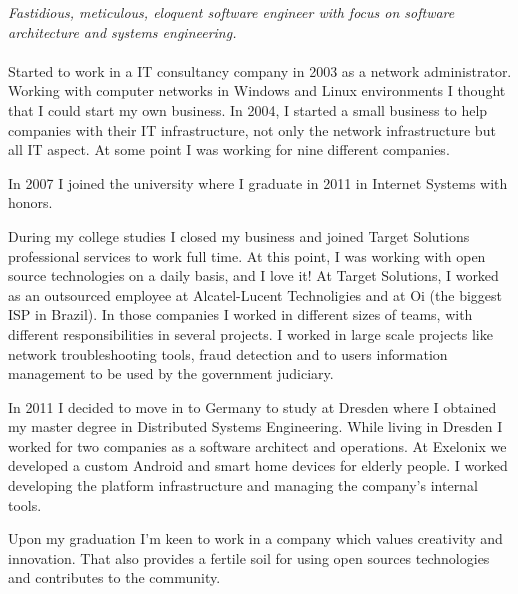 \documentclass[10pt,a4paper]{article}
\begin{document}
\vspace{-1.3em}  %
\begin{multicols}{2}  %
\noindent \emph{Fastidious, meticulous, eloquent software engineer with focus on software architecture and systems engineering.}
\\
\\
Started to work in a IT consultancy company in 2003 as a network administrator. Working with computer networks in Windows and Linux environments I thought that I could start my own business. In 2004, I started a small business to help companies with their IT infrastructure, not only the network infrastructure but all IT aspect. At some point I was working for nine different companies.

In 2007 I joined the  university where I graduate in 2011 in Internet Systems with honors.

During my college studies I closed my business and joined Target Solutions professional services to work full time. At this point, I was working with open source technologies on a daily basis, and I love it! At Target Solutions, I worked as an outsourced employee at Alcatel-Lucent Technoligies and at Oi (the biggest ISP in Brazil). In those companies I worked in different sizes of teams, with different responsibilities in several projects. I worked in large scale projects like network troubleshooting tools, fraud detection and to users information management to be used by the government judiciary.

In 2011 I decided to move in to Germany to study at  Dresden where I obtained my master degree in Distributed Systems Engineering. While living in Dresden I worked for two companies as a software architect and operations. At Exelonix we developed a custom Android and smart home devices for elderly people. I worked developing the platform infrastructure and managing the company's internal tools.


Upon my graduation I'm keen to work in a company which values creativity and innovation. That also provides a fertile soil for using open sources technologies and contributes to the community.

\end{multicols}
\end{document}
